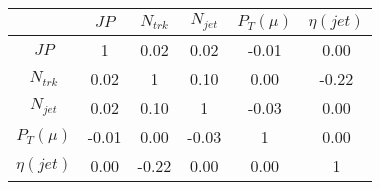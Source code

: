 \begin{tabular}{|c|c|c|c|c|c|} 
\hline
 & $JP$ & $N_{trk}$ & $N_{jet}$ & $P_{T} (\mu)$ & $\eta (jet)$ \\ \hline
$JP$ & 1 & 0.02 & 0.02 & -0.01 & 0.00 \\
$N_{trk}$ & 0.02 & 1 & 0.10 & 0.00 & -0.22 \\
$N_{jet}$ & 0.02 & 0.10 & 1 & -0.03 & 0.00 \\
$P_{T} (\mu)$ & -0.01 & 0.00 & -0.03 & 1 & 0.00 \\
$\eta (jet)$ & 0.00 & -0.22 & 0.00 & 0.00 & 1 \\
\hline 
\end{tabular} 



